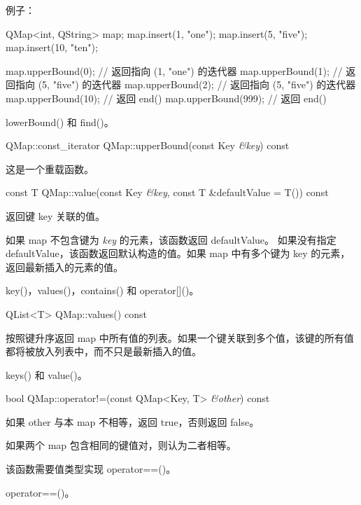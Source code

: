 例子：

\begin{cppcode}
QMap<int, QString> map;
map.insert(1, "one");
map.insert(5, "five");
map.insert(10, "ten");

map.upperBound(0);      // 返回指向 (1, "one") 的迭代器
map.upperBound(1);      // 返回指向 (5, "five") 的迭代器
map.upperBound(2);      // 返回指向 (5, "five") 的迭代器
map.upperBound(10);     // 返回 end()
map.upperBound(999);    // 返回 end()
\end{cppcode}

\begin{seeAlso}
lowerBound() 和 find()。
\end{seeAlso}

QMap::const\_iterator QMap::upperBound(const Key \emph{\&key}) const

这是一个重载函数。

\splitLine

const T QMap::value(const Key \emph{\&key}, const T \&defaultValue = T()) const

返回键 key 关联的值。

如果 map 不包含键为 \emph{key} 的元素，该函数返回 defaultValue。 如果没有指定 defaultValue，该函数返回默认构造的值。如果 map 中有多个键为 key 的元素，返回最新插入的元素的值。

\begin{seeAlso}
key()，values()，contains() 和 operator[]()。
\end{seeAlso}

\splitLine

QList<T> QMap::values() const

按照键升序返回 map 中所有值的列表。如果一个键关联到多个值，该键的所有值都将被放入列表中，而不只是最新插入的值。

\begin{seeAlso}
keys() 和 value()。
\end{seeAlso}

\splitLine

bool QMap::operator!=(const QMap<Key, T> \emph{\&other}) const

如果 other 与本 map 不相等，返回 true，否则返回 false。

如果两个 map 包含相同的键值对，则认为二者相等。

该函数需要值类型实现 operator==()。

\begin{seeAlso}
operator==()。
\end{seeAlso}

